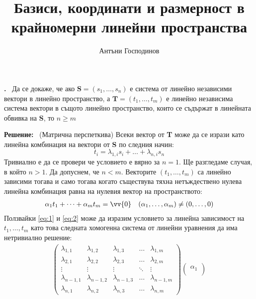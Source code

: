 \documentclass[a4paper,12pt,fleqn]{article}
\title{Базиси, координати и размерност в крайномерни линейни пространства}
\author{Антъни Господинов}
\date{}
\newcounter{problem}
\newcommand\problem{%
  \stepcounter{problem}%
  \textbf{\theproblem.}~%
}
\newcommand\solution{%
  \textbf{Решение:}~%
}
\begin{document}
\maketitle

    \problem{
      Да се докаже, че ако \( \textbf{S}=\left( s_{1},\dots,s_{n} \right) \) е система от линейно независими вектори в линейно пространство, а \( \textbf{T}=\left( t_{1},\dots,t_{m} \right) \) е линейно независима система вектори в същото линейно пространство, които се съдържат в линейната обвивка на \textbf{S}, то \( n \geq m \)
    }

    \solution{(Матрична перспеткива)
      Всеки вектор от \textbf{T} може да се изрази като линейна комбинация на вектори от \textbf{S} по следния начин:
      \begin{equation} \label{eq:1}
        t_{i}=\lambda_{1,i} s_{i} + \dots + \lambda_{n,i} s_{n}
      \end{equation}
      Тривиално е да се провери че условието е вярно за \( n=1 \).
      Ще разгледаме случая, в който \( n > 1 \). Да допуснем, че \( n<m \). Векторите \( (t_{1},\dots,t_{m}) \) са линейно зависими тогава и само тогава когато съществува тяхна нетъждествено нулева линейна комбинация равна на нулевия вектор на пространството:
      \begin{align} \label{eq:2}
        \alpha_{1}t_{1}+\dots+\alpha_{m}t_{m}=\vv{0} && \left( \alpha_{1},\dots,\alpha_{m} \right) \neq \left( 0,\dots,0 \right)
      \end{align} 
      Ползвайки \eqref{eq:1} и \eqref{eq:2} може да изразим условието за линейна зависимост на \( t_{1},\dots,t_{m} \) като това следната хомогенна система от линейни уравнения да има нетривиално решение:
      \begin{gather}\label{eq:3}
        \begin{pmatrix}
          \lambda_{1, 1} & \lambda_{1, 2} & \lambda_{1, 3} & \dots & \lambda_{1, m} \\
          \lambda_{2, 1} & \lambda_{2, 2} & \lambda_{2, 3} & \dots & \lambda_{2, m} \\
          \vdots & \vdots & \vdots & \ddots & \vdots \\
          \lambda_{n-1, 1} & \lambda_{n-1, 2} & \lambda_{n-1, 3} & \dots & \lambda_{n-1, m}  \\
          \lambda_{n, 1} & \lambda_{n, 2} & \lambda_{n, 3} & \dots & \lambda_{n, m} 
        \end{pmatrix}
        \begin{pmatrix}
          \alpha_{1} \\

\end{pmatrix}
\end{gather}}
\end{document}
